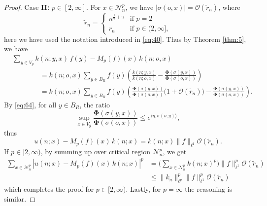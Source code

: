 \documentclass[11pt]{amsart}
\newcommand{\calO}{\mathcal{O}}
\newcommand{\scrN}{\mathscr{N}}
\newcommand{\sprod}[2]{\langle {#1}, {#2} \rangle}
\theoremstyle{plain}
\newcounter{thm}
\theoremstyle{definition}
\numberwithin{equation}{section}
\begin{document}
\begin{proof}
	\vspace*{1ex}
	\noindent
	{Case {\bf II:} $p \in [2, \infty]$.} 
	For $x \in \scrN_n^p$, we have $|\sigma(o,x)|=\calO(\tilde{r}_n)$, where
	\[
		\tilde{r}_n=
		\begin{cases}
			n^{\frac{1}{2} + \gamma} &\text{if } p =2 \\
			r_n &\text{if } p \in (2, \infty],
		\end{cases}
	\]
	here we have used the notation introduced in \eqref{eq:40}. Thus by Theorem \ref{thm:5}, we have
	\begin{align*}
		&\sum_{y\in V_g} k(n;y,x)\,f(y) - M_p(f)(x)\, k(n;o,x) \\
		&\qquad\qquad=
		k(n; o, x) 
		\sum_{y \in B_{R}} f(y) 
		\left( \frac{k(n;y,x)}{k(n;o,x)} - \frac{\mathbf{\Phi}(\sigma(y,x))}{\mathbf{\Phi}(\sigma(o,x))} \right)\\
		&\qquad\qquad=
		k(n; o, x) 
		\sum_{y \in B_{R}} f(y)
		\left( \frac{\mathbf{\Phi}(\sigma(y,x))}{\mathbf{\Phi}(\sigma(o,x))}\big(1+\calO(\tilde{r}_n)\big)
		-
		\frac{\mathbf{\Phi}(\sigma(y,x))}{\mathbf{\Phi}(\sigma(o,x))} \right).
	\end{align*}
	By \eqref{eq:64}, for all $y \in B_R$, the ratio
	\[
		\sup_{x \in V_g}
		\frac{\mathbf{\Phi}(\sigma(y,x))}{\mathbf{\Phi}(\sigma(o,x))} \leqslant e^{\sprod{\eta}{\sigma(o, y)}}, 
	\]
	thus
	\[
		u(n; x) - M_p(f)(x)\, k(n; x)
		=
		k(n;x) \|f\|_{\ell^1} \calO(\tilde{r}_n).
	\]
	If $p \in [2, \infty)$, by summing up over critical region $\scrN_n^p$, we get
	\begin{align*}
		\sum_{x \in \scrN_n^p} \left|u(n; x) - M_p(f)(x)\, k(n; x)\right|^p
		&=
		\bigg(\sum_{x \in \scrN_n^p} k(n; x)^p\bigg) \|f\|_{\ell^1}^p \calO(\tilde{r}_n) \\
		&\leqslant
		\|k_n\|_{\ell^p}^p  \|f\|_{\ell^1}^p \calO(\tilde{r}_n)
	\end{align*}
	which completes the proof for $p \in [2, \infty)$. Lastly, for $p = \infty$ the reasoning is similar.
\end{proof}
		
\end{document}
